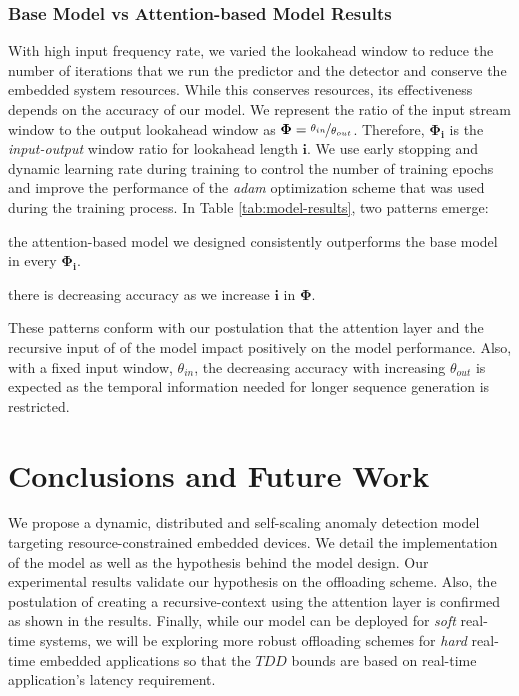 \subsubsection{Base Model vs Attention-based Model Results}
\label{subsec:att-vs-noatt}
With high input frequency rate, we varied the lookahead window to reduce the 
number of iterations that we run the predictor and the detector and conserve 
the embedded system resources. While this conserves resources, its 
effectiveness depends on the accuracy of our model. We represent the ratio of 
the input stream window to the output lookahead window as $ \bm{\Phi} = 
\nicefrac{\theta_{in}}{\theta_{out}} $. Therefore, $ \bm{\Phi_{i}} $ is the 
\emph{input-output} window ratio for lookahead length $ \bm{i} $. We use early 
stopping and dynamic learning rate during training to control the number of 
training epochs and improve the performance of the \emph{adam} 
\cite{kingma2014adam} optimization scheme that was used during the training 
process. In Table \ref{tab:model-results}, two patterns emerge:
\begin{enumerate*}[label={\alph*)},font={\bfseries}]
	\item the attention-based model we designed consistently outperforms the 
	base model in every $ \bm{\Phi_i} 
	$.
	\item there is decreasing accuracy as we increase $ \bm{i} $ in $ \bm{\Phi} 
	$. 
\end{enumerate*}
These patterns conform with our postulation that the attention layer and the 
recursive input of of the model impact positively on the model performance. 
Also, with a fixed input window, $ \theta_{in} $, the decreasing accuracy with 
increasing $ \theta_{out} $ is expected as the temporal information needed for 
longer sequence generation is restricted.

\section{Conclusions and Future Work}
\label{sec:conclusion}
We propose a dynamic, distributed and self-scaling anomaly detection model 
targeting resource-constrained embedded devices. We detail the implementation 
of the model as well as the hypothesis behind the model design. Our 
experimental results validate our hypothesis on the offloading scheme. Also, 
the postulation of creating a recursive-context using the attention layer is 
confirmed as shown in the results. Finally, while our model can be deployed for 
\emph{soft} real-time systems, we will be exploring more robust offloading 
schemes for \emph{hard} real-time embedded applications so that the $ TDD $ 
bounds are based on real-time application's latency requirement.